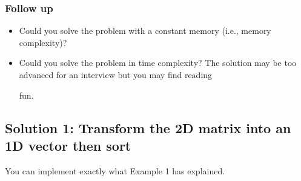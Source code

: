 \documentclass[letterpaper,12pt,english]{book}
\begin{document}
\subsubsection{Follow up}
\label{\detokenize{Priority_Queue/378_Kth_Smallest_Element_in_a_Sorted_Matrix:follow-up}}\begin{itemize}
\item {} 
\sphinxAtStartPar
Could you solve the problem with a constant memory (i.e.,  memory complexity)?

\item {} 
\sphinxAtStartPar
Could you solve the problem in  time complexity? The solution may be too advanced for an interview but you may find reading %
\begin{footnote}[61]\sphinxAtStartFootnote
{}
%
\end{footnote} fun.

\end{itemize}


\subsection{Solution 1: Transform the 2\sphinxhyphen{}D matrix into an 1\sphinxhyphen{}D vector then sort}
\label{\detokenize{Priority_Queue/378_Kth_Smallest_Element_in_a_Sorted_Matrix:solution-1-transform-the-2-d-matrix-into-an-1-d-vector-then-sort}}
\sphinxAtStartPar
You can implement exactly what Example 1 has explained.
\end{document}
